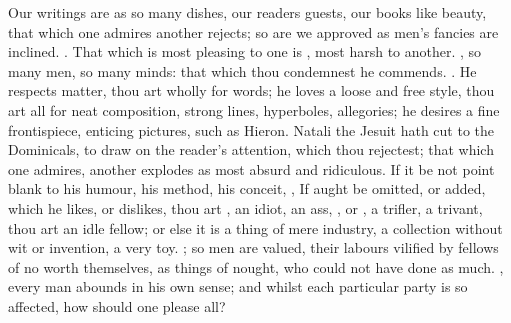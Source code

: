 Our writings are as so many dishes, our readers guests, our books like beauty,
that which one admires another rejects; so are we approved as men's fancies are
inclined. . That which is most
pleasing to one is , most harsh to another. , so many men, so many minds: that which thou condemnest he
commends. . He respects matter, thou art wholly for words; he loves a loose and
free style, thou art all for neat composition, strong lines, hyperboles,
allegories; he desires a fine frontispiece, enticing pictures, such as
Hieron. Natali the Jesuit hath cut to the Dominicals, to
draw on the reader's attention, which thou rejectest; that which one admires,
another explodes as most absurd and ridiculous. If it be not point blank to his
humour, his method, his conceit, , \etc{} If aught be omitted,
or added, which he likes, or dislikes, thou art , an idiot, an ass, , or , a trifler, a
trivant, thou art an idle fellow; or else it is a thing of mere industry, a
collection without wit or invention, a very toy.
; so men are valued, their labours vilified
by fellows of no worth themselves, as things of nought, who could not have done
as much. , every man abounds in his own
sense; and whilst each particular party is so affected, how should one please
all?



